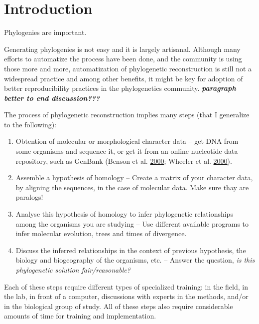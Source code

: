 \documentclass[]{article}
\providecommand{\tightlist}{%
  \setlength{\itemsep}{0pt}\setlength{\parskip}{0pt}}
\begin{document}
\newpage

\hypertarget{introduction}{%
\section{Introduction}\label{introduction}}

Phylogenies are important.

Generating phylogenies is not easy and it is largely artisanal. Although many efforts to automatize the process have been done, and the community is using those more and more, automatization of phylogenetic reconstruction is still not a widespread practice and among other benefits, it might be key for adoption of better reproducibility practices in the phylogenetics community. \textbf{\emph{paragraph better to end discussion??? }}

The process of phylogenetic reconstruction implies many steps (that I generalize to the following):

\begin{enumerate}
\def\labelenumi{\arabic{enumi}.}
\tightlist
\item
  Obtention of molecular or morphological character data -- get DNA from some organisms
  and sequence it, or get it from an online nucleotide data repository, such as GenBank (Benson et al. \protect\hyperlink{ref-benson2000genbank}{2000}; Wheeler et al. \protect\hyperlink{ref-wheeler2000database}{2000}).
\item
  Assemble a hypothesis of homology -- Create a matrix of your character data, by
  aligning the sequences, in the case of molecular data. Make sure thay are paralogs!
\item
  Analyse this hypothesis of homology to infer phylogenetic relationships among
  the organisms you are studying -- Use different available programs to infer molecular
  evolution, trees and times of divergence.
\item
  Discuss the inferred relationships in the context of previous hypothesis, the
  biology and biogeography of the organisms, etc. -- Answer the question, \emph{is this phylogenetic solution fair/reasonable?}
\end{enumerate}

Each of these steps require different types of specialized training: in the field,
in the lab, in front of a computer, discussions with experts in the methods, and/or in the biological group of study.
All of these steps also require considerable amounts of time for training and implementation.
\end{document}

